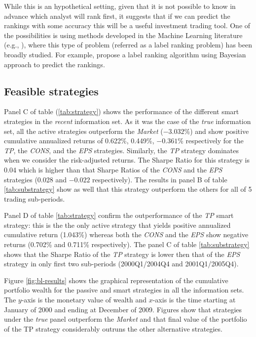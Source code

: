 \documentclass{article}\usepackage[]{graphicx}\usepackage[]{color}
\newcommand{\tr}{\textit{true}}
\newcommand{\naive}{\textit{recent}}
\begin{document}
While this is an hypothetical setting, given that it is not possible to know in advance which analyst will rank first, it suggests that if we can predict the rankings with some accuracy this will be a useful investment trading tool. One of the possibilities is using methods developed in the Machine Learning literature (e.g., \cite{aiguzhinov2010,brazdil2003}), where this type of problem (referred as a label ranking problem) has been broadly studied. For example, \cite{aiguzhinov2010} propose a label ranking algorithm using Bayesian approach to predict the rankings.



\subsection{Feasible strategies}
Panel C of table (\ref{tab:strategy}) shows the performance of the different smart strategies in the \naive{} information set. As it was the  case of the \tr{} information set, all the active strategies outperform the \textit{Market} (\ensuremath{-3.032}\%)  and show positive cumulative annualized returns of 0.622\%,  0.449\%, \ensuremath{-0.361}\% respectively for the \textit{TP}, the \textit{CONS}, and the \textit{EPS} strategies. Similarly, the \textit{TP} strategy dominates when we consider the risk-adjusted returns. The Sharpe Ratio for this strategy is 0.04 which is higher than that Sharpe Ratios of the \textit{CONS} and  the \textit{EPS} strategies  (0.028 and \ensuremath{-0.022} respectively). The results in panel B of table \ref{tab:substrategy} show as well that this strategy outperform the others for all of 5 trading sub-periods. 

Panel D of table \ref{tab:strategy} confirm the outperformance of the \textit{TP} smart strategy: this is the the only active strategy that yields positive annualized cumulative return (1.043\%) whereas both  the \textit{CONS} and the \textit{EPS} show negative returns (0.702\% and 0.711\% respectively). The panel C of table \ref{tab:substrategy} shows that the Sharpe Ratio of the \textit{TP} strategy is lower then that of the \textit{EPS} strategy in only first two sub-periods (2000Q1/2004Q4 and 2001Q1/2005Q4).


Figure \ref{fig:bl-results} shows the graphical representation of the cumulative portfolio wealth for  the passive and smart strategies in all the information sets. The $y$-axis is the monetary value of wealth and $x$-axis is the time starting at January of 2000 and ending at December of 2009. Figures show that strategies under the \tr{} panel outperform the \emph{Market} and that final value  of the portfolio of the TP strategy considerably outruns the other alternative strategies.
\end{document}
